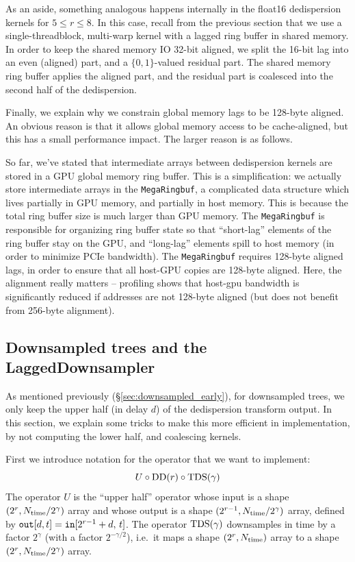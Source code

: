 \documentclass{article}
\numberwithin{equation}{section}   %
\def\DD{{\rm DD}}
\def\TDS{{\rm TDS}}
\begin{document}
As an aside, something analogous happens internally in the float16 dedispersion
kernels for $5 \le r \le 8$. In this case, recall from the previous section that
we use a single-threadblock, multi-warp kernel with a lagged ring buffer in shared
memory. In order to keep the shared memory IO 32-bit aligned, we split the 16-bit
lag into an even (aligned) part, and a $\{0,1\}$-valued residual part. The shared
memory ring buffer applies the aligned part, and the residual part is coalesced into
the second half of the dedispersion.

Finally, we explain why we constrain global memory lags to be 128-byte aligned.
An obvious reason is that it allows global memory access to be cache-aligned, but
this has a small performance impact.
The larger reason is as follows.

So far, we've stated that intermediate arrays between dedispersion kernels are
stored in a GPU global memory ring buffer.
This is a simplification: we actually store intermediate arrays in the {\tt MegaRingbuf},
a complicated data structure which lives partially in GPU memory, and partially in host
memory.
This is because the total ring buffer size is much larger than GPU memory.
The {\tt MegaRingbuf} is responsible for organizing ring buffer state so that ``short-lag''
elements of the ring buffer stay on the GPU, and ``long-lag'' elements spill to host
memory (in order to minimize PCIe bandwidth).
The {\tt MegaRingbuf} requires 128-byte aligned lags, in order to ensure that all
host-GPU copies are 128-byte aligned.
Here, the alignment really matters -- profiling shows that host-gpu bandwidth is
significantly reduced if addresses are not 128-byte aligned (but does not benefit
from 256-byte alignment).

\subsection{Downsampled trees and the LaggedDownsampler}
\label{ssec:lagged_downsampler}

As mentioned previously (\S\ref{sec:downsampled_early}), for downsampled trees,
we only keep the upper half (in delay $d$) of the dedispersion transform output.
In this section, we explain some tricks to make this more efficient in implementation,
by not computing the lower half, and coalescing kernels.

First we introduce notation for the operator that we want to implement:
\begin{equation}
U \circ \DD(r) \circ \TDS(\gamma)
\end{equation}
The operator $U$ is the ``upper half'' operator whose
input is a shape $(2^r,N_{\rm time}/2^\gamma)$ array and whose output is a shape
$(2^{r-1},N_{\rm time}/2^\gamma)$ array, defined by ${\tt out}[d,t] = {\tt in}[2^{r-1}+d,\,t]$.
The operator $\TDS(\gamma)$ downsamples in time by a factor $2^\gamma$
(with a factor $2^{-\gamma/2}$), i.e.\ it maps a shape $(2^r,N_{\rm time})$ array to a
shape $(2^r,N_{\rm time}/2^\gamma)$ array.
\end{document}
